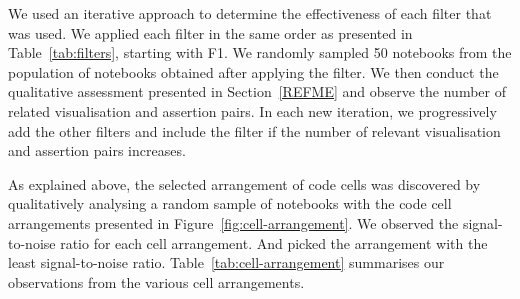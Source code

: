 \documentclass[acmsmall,screen,review,anonymous]{acmart}
\begin{document}
We used an iterative approach to determine the effectiveness of each
filter that was used. We applied each filter in the same order as
presented in Table~\ref{tab:filters}, starting with F1. We randomly
sampled 50 notebooks from the population of notebooks obtained after
applying the filter. We then conduct the qualitative assessment
presented in Section~\ref{REFME} and observe the number of related
visualisation and assertion pairs. In each new iteration, we
progressively add the other filters and include the filter if the
number of relevant visualisation and assertion pairs increases.

As explained above, the selected arrangement of code cells was discovered by qualitatively analysing a random sample of notebooks with the code cell arrangements presented in Figure~\ref{fig:cell-arrangement}. We observed the signal-to-noise ratio for each cell arrangement. And picked the arrangement with the least signal-to-noise ratio. Table~\ref{tab:cell-arrangement} summarises our observations from the various cell arrangements.
\end{document}
